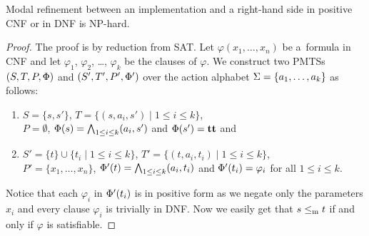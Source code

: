 \begin{proposition}
Modal refinement between an implementation and a \linebreak right-hand side
in positive CNF or in DNF is NP-hard.
\end{proposition}
\begin{proof}
The proof is by reduction from SAT. %
Let $\varphi(x_1,\ldots,x_n)$ be a~formula in CNF
and let $\varphi_1$, $\varphi_2$, \ldots, $\varphi_k$ be the clauses of 
$\varphi$.
We construct two PMTSs $(S,T,P,\mathrm{\Phi})$ and $(S',T',P',\mathrm{\Phi}')$ over the
action alphabet $\mathrm{\Sigma} = \{a_1, \ldots, a_k\}$
as follows: 
\begin{enumerate}
    \item $S = \{s,s'\}$, 
    $T = \{(s, a_i, s') \mid 1 \le i \le k\}$,\\
    $P = \emptyset$, 
    $\mathrm{\Phi}(s) = \bigwedge_{1 \le i \le k} (a_i,s')$ and
    $\mathrm{\Phi}(s') = \mathbf{tt}$ and
    \item $S' = \{t\} \cup \{t_i \mid 1 \le i \le k\}$,
    $T' = \{(t,a_i,t_i) \mid 1 \le i \le k\}$, \\
    $P' = \{ x_1, \ldots, x_n \}$,
    $\mathrm{\Phi}'(t) = \bigwedge_{1 \le i \le k} (a_i,t_i)$
    and $\mathrm{\Phi}'(t_i) = \varphi_i$ for all $1 \le i \le k$.
\end{enumerate}
Notice that each $\varphi_i$ in $\mathrm{\Phi}'(t_i)$ is in positive
form as we negate only the parameters $x_i$ and every clause
$\varphi_i$ is trivially in DNF. 
Now we easily get that 
$s \le_\mathrm m t$ if and only if $\varphi$ is satisfiable.

\end{proof}


